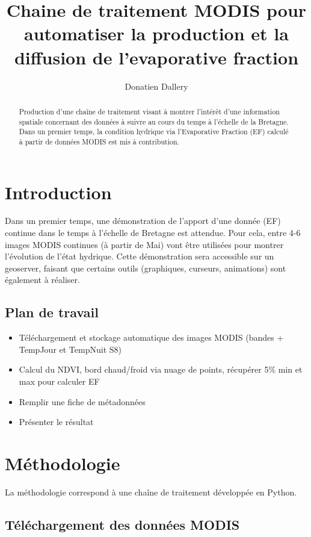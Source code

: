 \documentclass[10pt,a4paper]{article}
\author{Donatien Dallery}
\title{Chaine de traitement MODIS pour automatiser la production et la diffusion de l'evaporative fraction}
\begin{document}
\maketitle

\begin{abstract}
Production d'une chaîne de traitement visant à montrer l'intérêt d'une information spatiale concernant des données à suivre au cours du temps à l'échelle de la Bretagne. Dans un premier temps, la condition hydrique via l'Evaporative Fraction (EF) calculé à partir de données MODIS est mis à contribution.
\end{abstract}

\section{Introduction}

Dans un premier temps, une démonstration de l'apport d'une donnée (EF) continue dans le temps à l'échelle de Bretagne est attendue. Pour cela, entre 4-6 images MODIS continues (à partir de Mai) vont être utilisées pour montrer l'évolution de l'état hydrique. Cette démonstration sera accessible sur un geoserver, faisant que certains outils (graphiques, curseurs, animations) sont également à réaliser. 

\subsection{Plan de travail}

\begin{itemize}
\item Téléchargement et stockage automatique des images MODIS (bandes + TempJour et TempNuit S8)
\item Calcul du NDVI, bord chaud/froid via nuage de points, récupérer 5\% min et max pour calculer EF
\item Remplir une fiche de métadonnées
\item Présenter le résultat
\end{itemize}

\section{Méthodologie}

La méthodologie correspond à une chaîne de traitement développée en Python.

\subsection{Téléchargement des données MODIS}
\end{document}
